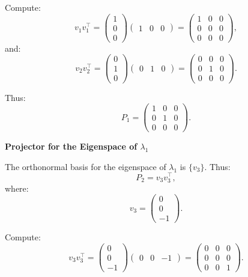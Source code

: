 \documentclass{article}
\theoremstyle{plain}
\numberwithin{thm}{section}
\theoremstyle{definition}
\begin{document}
\begin{enumerate}
    Compute:
    \[
    v_1 v_1^\top = \begin{pmatrix} 1 \\ 0 \\ 0 \end{pmatrix} \begin{pmatrix} 1 & 0 & 0 \end{pmatrix} = \begin{pmatrix} 1 & 0 & 0 \\ 0 & 0 & 0 \\ 0 & 0 & 0 \end{pmatrix},
    \]
    and:
    \[
    v_2 v_2^\top = \begin{pmatrix} 0 \\ 1 \\ 0 \end{pmatrix} \begin{pmatrix} 0 & 1 & 0 \end{pmatrix} = \begin{pmatrix} 0 & 0 & 0 \\ 0 & 1 & 0 \\ 0 & 0 & 0 \end{pmatrix}.
    \]
    
    Thus:
    \[
    P_1 = \begin{pmatrix} 1 & 0 & 0 \\ 0 & 1 & 0 \\ 0 & 0 & 0 \end{pmatrix}.
    \]
    
    \textbf{Projector for the Eigenspace of $\lambda_1$}
    
    The orthonormal basis for the eigenspace of $\lambda_1$ is $\{v_3\}$. Thus:
    \[
    P_2 = v_3 v_3^\top,
    \]
    where:
    \[
    v_3 = \begin{pmatrix} 0 \\ 0 \\ -1 \end{pmatrix}.
    \]
    
    Compute:
    \[
    v_3 v_3^\top = \begin{pmatrix} 0 \\ 0 \\ -1 \end{pmatrix} \begin{pmatrix} 0 & 0 & -1 \end{pmatrix} = \begin{pmatrix} 0 & 0 & 0 \\ 0 & 0 & 0 \\ 0 & 0 & 1 \end{pmatrix}.
    \]
    

\end{enumerate}
\end{document}
